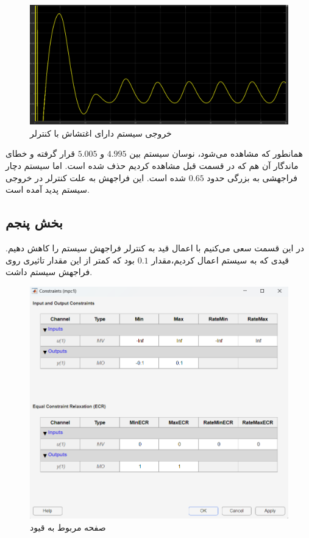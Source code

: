 \documentclass[14pt, a4paper]{extarticle}
\begin{document}
\begin{figure}[h!]
	\centering
	\includegraphics[scale = 0.4]{Q1_4_result3.png}
	\caption{خروجی سیستم دارای اغتشاش با کنترلر 
		}
\end{figure}

همانطور که مشاهده می‌شود، نوسان سیستم بین 
$4.995$
و 
$5.005$
قرار گرفته و خطای ماندگار آن هم که در قسمت قبل مشاهده کردیم حذف شده است. اما سیستم دچار فراجهشی به بزرگی حدود
$0.65$
شده است. این فراجهش به علت کنترلر 
در خروجی سیستم پدید آمده است.
\newpage
\subsection{بخش پنجم}

در این قسمت سعی می‌کنیم با اعمال قید به کنترلر
فراجهش سیستم را کاهش دهیم. قیدی که به سیستم اعمال کردیم،‌مقدار 
$0.1$
بود که کمتر از این مقدار تاثیری روی فراجهش سیستم داشت.

 \begin{figure}[h!]
	\centering
	\includegraphics[scale = 0.5]{Q1_5_cons.png}
	\caption{صفحه مربوط به قیود 
		}
\end{figure}
\end{document}
